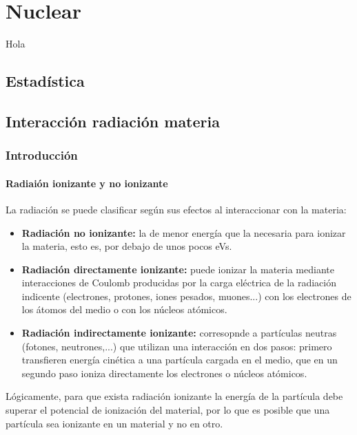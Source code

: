 

\chapter{Nuclear}

Hola

\section{Estadística}

\section{Interacción radiación materia}

\subsection{Introducción}

\subsubsection{Radiaión ionizante y no ionizante}

La radiación se puede clasificar según sus efectos al interaccionar con la materia:

\begin{itemize}
    \item \textbf{Radiación no ionizante:} la de menor energía que la necesaria para ionizar la materia, esto es, por debajo de unos pocos eVs.
    \item \textbf{Radiación directamente ionizante:} puede ionizar la materia mediante interacciones de Coulomb producidas por la carga eléctrica de la radiación indicente (electrones, protones, iones pesados, muones...) con los electrones de los átomos del medio o con los núcleos atómicos.
    \item \textbf{Radiación indirectamente ionizante:} corresopnde a partículas neutras (fotones, neutrones,...) que utilizan una interacción en dos pasos: primero transfieren energía cinética a una partícula cargada en el medio, que en un segundo paso ioniza directamente los electrones o núcleos atómicos.
\end{itemize}
Lógicamente, para que exista radiación ionizante la energía de la partícula debe superar el potencial de ionización del material, por lo que es posible que una partícula sea ionizante en un material y no en otro.

